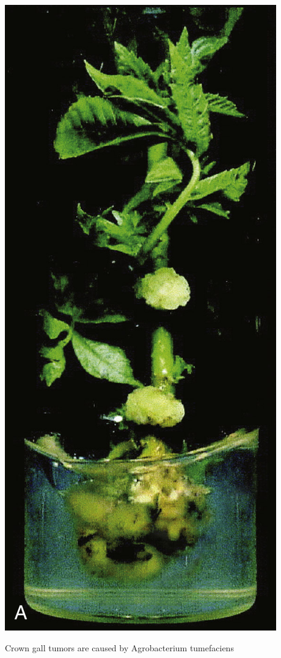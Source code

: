 \documentclass[nofonts,]{tufte-handout}
\begin{document}
\begin{marginfigure}
\includegraphics[width=0.7\linewidth]{./images/agrobacterium_gall_a} \caption[Crown gall tumors are caused by Agrobacterium tumefaciens]{Crown gall tumors are caused by Agrobacterium tumefaciens}\label{fig:agrobacterium-gall}
\end{marginfigure}
\end{document}
